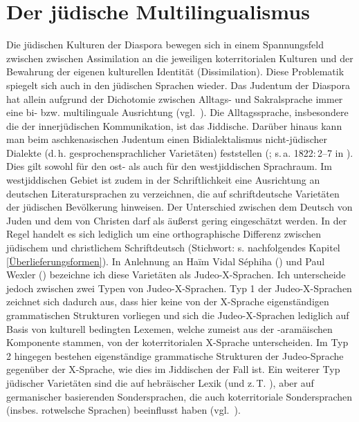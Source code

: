  
 
 
 
 \section{Der jüdische Multilingualismus}\label{multilingualismus}%
Die jüdischen Kulturen der Diaspora bewegen sich in einem Spannungsfeld  zwischen zwischen As­si­mi­la­ti­on an die jeweiligen koterritorialen Kulturen und der Bewahrung der eigenen kulturellen Identität (Dis­si­mi­la­ti­on). Diese Problematik spiegelt sich auch in den jüdischen Sprachen wieder. Das Judentum der Diaspora hat allein aufgrund der Dichotomie zwischen Alltags- und Sakralsprache immer eine bi- bzw. multilinguale Ausrichtung (vgl.\, \citealt{Weinreich1962,Mieses1915,Fischer1936}). Die Alltagssprache, insbesondere die der innerjüdischen Kommunikation, ist das Jiddische. Darüber hinaus kann man beim aschkenasischen Judentum einen Bidialektalismus nicht-jüdischer Dialekte (d.\,h. gesprochensprachlicher Varietäten) feststellen (\citealt{Weinreich1962,Schaefer2008,Schaefer2014}{; } s.\,a.  1822:\,2–7 in \citealt{Lowenstein1975}). Dies gilt sowohl für den ost- als auch für den westjiddischen Sprachraum. Im westjiddischen Gebiet ist zudem in der Schriftlichkeit eine Ausrichtung an deutschen Literatursprachen zu verzeichnen, die auf schriftdeutsche Varietäten der jüdischen Bevölkerung hinweisen. Der Unterschied zwischen dem Deutsch von Juden und dem von Christen darf als äußerst gering eingeschätzt werden. In der Regel handelt es sich lediglich um eine orthographische Differenz zwischen jüdischem und christlichem Schriftdeutsch (Stichwort:  s. nachfolgendes Kapitel \ref{Überlieferungsformen}). In Anlehnung an Haïm Vidal Séphiha  (\citeyear[193]{Sephiha1985}) und Paul Wexler (\citeyear[7]{Wexler1987}) bezeichne ich diese Varietäten als Judeo-X-Sprachen.
Ich unterscheide jedoch zwischen zwei Typen von Judeo-X-Sprachen. Typ 1 der Judeo-X-Sprachen zeichnet sich dadurch aus, dass hier keine von der X-Sprache eigenständigen grammatischen Strukturen vorliegen und sich die Judeo-X-Sprachen lediglich auf Basis von kulturell bedingten Lexemen, welche zumeist aus der -aramäischen Komponente stammen, von der koterritorialen X-Sprache unterscheiden. Im Typ 2 hingegen bestehen eigenständige grammatische Strukturen der Judeo-Sprache gegenüber der X-Sprache, wie dies im Jiddischen der Fall ist. Ein weiterer Typ jüdischer Varietäten sind die auf hebräischer Lexik (und z.\,T. ), aber auf germanischer  basierenden Sondersprachen, die auch koterritoriale Sondersprachen (insbes. rotwelsche Sprachen) beeinflusst haben (vgl.\, \citealt{GuggenheimGruenberg1981,Matras1996}).

